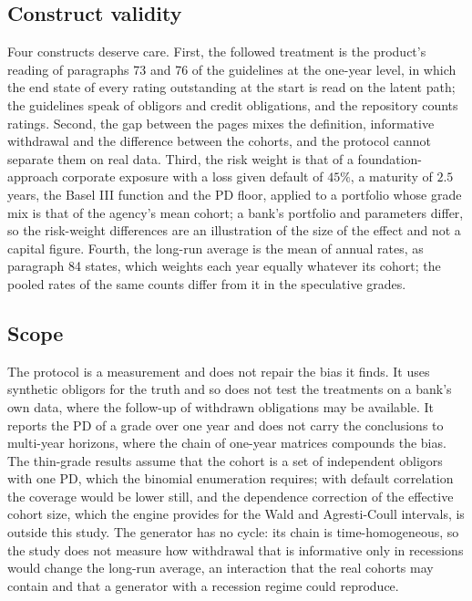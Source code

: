 \subsection{Construct validity}
\label{sec:limitations-construct}

Four constructs deserve care. First, the followed treatment is the product's reading of paragraphs 73 and 76 of the guidelines at the one-year level, in which the end state of every rating outstanding at the start is read on the latent path; the guidelines speak of obligors and credit obligations, and the repository counts ratings. Second, the gap between the pages mixes the definition, informative withdrawal and the difference between the cohorts, and the protocol cannot separate them on real data. Third, the risk weight is that of a foundation-approach corporate exposure with a loss given default of $45\%$, a maturity of $2.5$ years, the Basel III function and the PD floor, applied to a portfolio whose grade mix is that of the agency's mean cohort; a bank's portfolio and parameters differ, so the risk-weight differences are an illustration of the size of the effect and not a capital figure. Fourth, the long-run average is the mean of annual rates, as paragraph 84 states, which weights each year equally whatever its cohort; the pooled rates of the same counts differ from it in the speculative grades.

\subsection{Scope}
\label{sec:limitations-scope}

The protocol is a measurement and does not repair the bias it finds. It uses synthetic obligors for the truth and so does not test the treatments on a bank's own data, where the follow-up of withdrawn obligations may be available. It reports the PD of a grade over one year and does not carry the conclusions to multi-year horizons, where the chain of one-year matrices compounds the bias. The thin-grade results assume that the cohort is a set of independent obligors with one PD, which the binomial enumeration requires; with default correlation the coverage would be lower still, and the dependence correction of the effective cohort size, which the engine provides for the Wald and Agresti-Coull intervals, is outside this study. The generator has no cycle: its chain is time-homogeneous, so the study does not measure how withdrawal that is informative only in recessions would change the long-run average, an interaction that the real cohorts may contain and that a generator with a recession regime could reproduce. %
